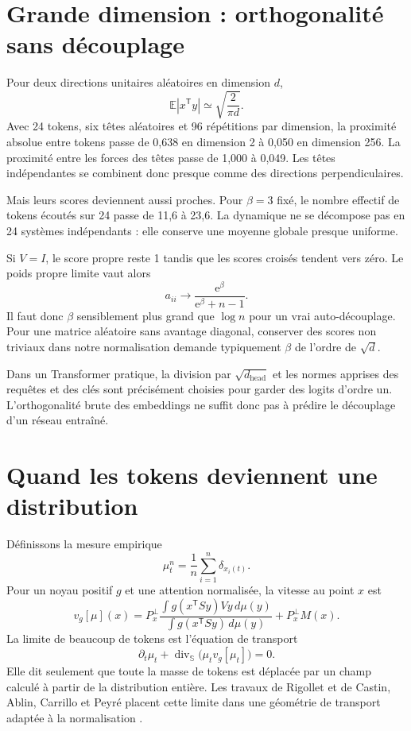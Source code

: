 \documentclass[11pt,a4paper]{article}
\theoremstyle{definition}
\newcommand{\sphere}{\mathbb S}
\newcommand{\T}{\mathsf T}
\newcommand{\e}{\mathrm e}
\begin{document}
\section{Grande dimension : orthogonalité sans découplage}
\label{sec:dimension}

Pour deux directions unitaires aléatoires en dimension $d$,
\[
 \mathbb E|x^{\T}y|\simeq\sqrt{\frac{2}{\pi d}}.
\]
Avec 24 tokens, six têtes aléatoires et 96 répétitions par dimension, la proximité
absolue entre tokens passe de 0,638 en dimension 2 à 0,050 en dimension 256. La
proximité entre les forces des têtes passe de 1,000 à 0,049. Les têtes indépendantes
se combinent donc presque comme des directions perpendiculaires.

Mais leurs scores deviennent aussi proches. Pour $\beta=3$ fixé, le nombre effectif
de tokens écoutés sur 24 passe de 11,6 à 23,6. La dynamique ne se décompose pas en 24
systèmes indépendants : elle conserve une moyenne globale presque uniforme.

Si $V=I$, le score propre reste 1 tandis que les scores croisés tendent vers zéro. Le
poids propre limite vaut alors
\begin{equation}
 a_{ii}\longrightarrow\frac{\e^{\beta}}{\e^{\beta}+n-1}.\label{eq:self-mass}
\end{equation}
Il faut donc $\beta$ sensiblement plus grand que $\log n$ pour un vrai auto-découplage.
Pour une matrice aléatoire sans avantage diagonal, conserver des scores non triviaux
dans notre normalisation demande typiquement $\beta$ de l'ordre de $\sqrt d$.

Dans un Transformer pratique, la division par $\sqrt{d_{\mathrm{head}}}$ et les normes
apprises des requêtes et des clés sont précisément choisies pour garder des logits
d'ordre un. L'orthogonalité brute des embeddings ne suffit donc pas à prédire le
découplage d'un réseau entraîné.

\section{Quand les tokens deviennent une distribution}
\label{sec:meanfield}

Définissons la mesure empirique
\[
 \mu_t^n=\frac1n\sum_{i=1}^n\delta_{x_i(t)}.
\]
Pour un noyau positif $g$ et une attention normalisée, la vitesse au point $x$ est
\begin{equation}
 v_g[\mu](x)=P_x^{\perp}
 \frac{\int g(x^{\T}Sy)Vy\,d\mu(y)}
 {\int g(x^{\T}Sy)\,d\mu(y)}+P_x^{\perp}M(x).\label{eq:mean-field-velocity}
\end{equation}
La limite de beaucoup de tokens est l'équation de transport
\begin{equation}
 \partial_t\mu_t+\operatorname{div}_{\sphere}
 \bigl(\mu_t v_g[\mu_t]\bigr)=0.\label{eq:transport}
\end{equation}
Elle dit seulement que toute la masse de tokens est déplacée par un champ calculé à
partir de la distribution entière. Les travaux de Rigollet et de Castin, Ablin,
Carrillo et Peyré placent cette limite dans une géométrie de transport adaptée à la
normalisation \cite{rigollet2025meanfield,castin2025unified}.
\end{document}
